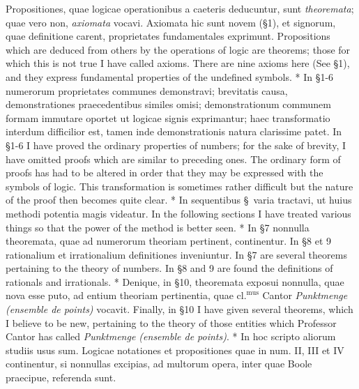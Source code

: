 \documentclass{book}
\newenvironment{translateTwoCol}
               { %
                 \columnratio{0.5, 0.5} \begin{paracol}{2}
                 \newcommand{\LAT}{\switchcolumn[0]*}
                 \newcommand{\ENG}{\switchcolumn[1]}
               }
               { %
                 \let\ENG\undefined
                 \let\LAT\undefined
                 \end{paracol}
               }
\begin{document}
\begin{translateTwoCol}
Propositiones, quae logicae operationibus a caeteris deducuntur, sunt \emph{theoremata}; quae vero non, \emph{axiomata} vocavi. Axiomata hic sunt novem (\S 1), et signorum, quae definitione carent, proprietates fundamentales exprimunt.
\ENG
Propositions which are deduced from others by the operations of logic are theorems; those for which this is not true I have called axioms. There are nine axioms here (See \S 1), and they express fundamental properties of the undefined symbols.
\LAT
In \S 1-6 numerorum proprietates communes demonstravi; brevitatis causa, demonstrationes praecedentibus similes omisi; demonstrationum communem formam immutare oportet ut logicae signis exprimantur; haec transformatio interdum difficilior est, tamen inde demonstrationis natura clarissime patet.
\ENG
In \S 1-6 I have proved the ordinary properties of numbers; for the sake of brevity, I have omitted proofs which are similar to preceding ones. The ordinary form of proofs has had to be altered in order that they may be expressed with the symbols of logic. This transformation is sometimes rather difficult but the nature of the proof then becomes quite clear. 
\LAT
In sequentibus \S \ varia tractavi, ut huius methodi potentia magis videatur.
\ENG
In the following sections I have treated various things so that the power of the method is better seen.
\LAT
In \S 7 nonnulla theoremata, quae ad numerorum theoriam pertinent, continentur. In \S 8 et 9 rationalium et irrationalium definitiones inveniuntur.
\ENG
In \S 7 are several theorems pertaining to the theory of numbers. In \S 8 and 9 are found the definitions of rationals and irrationals.
\LAT
Denique, in \S 10, theoremata exposui nonnulla, quae nova esse puto, ad entium theoriam pertinentia, quae $\text{cl.}^{\text{mus}}$ Cantor \emph{Punktmenge (ensemble de points)} vocavit.
\ENG
Finally, in \S 10 I have given several theorems, which I believe to be new, pertaining to the theory of those entities which Professor Cantor has called \emph{Punktmenge (ensemble de points)}.
\LAT
In hoc scripto aliorum studiis usus sum. Logicae notationes et propositiones quae in num. II, III et IV continentur, si nonnullas excipias, ad multorum opera, inter quae Boole praecipue, referenda sunt.
\end{translateTwoCol}
\end{document}
